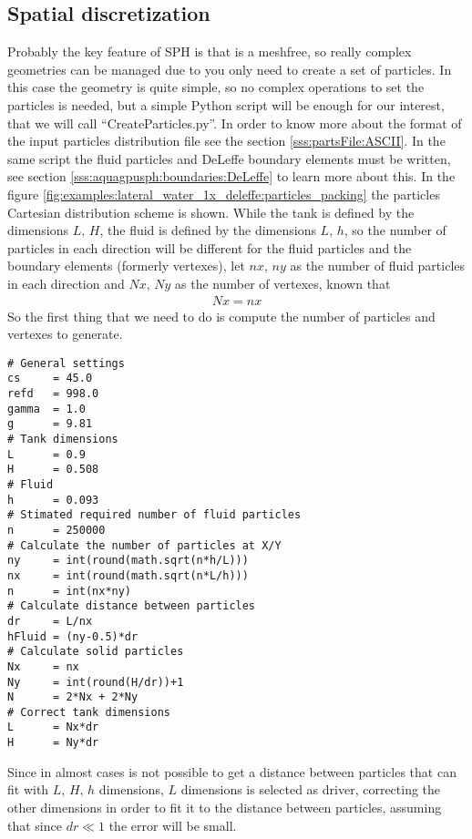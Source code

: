 \subsection{Spatial discretization}
\label{ss:example:lateral_water_1x_deleffe:discretization}
%
Probably the key feature of SPH is that is a meshfree, so really complex geometries can be managed due to you
only need to create a set of particles.\rc
%
In this case the geometry is quite simple, so no complex operations to set the particles is needed, but a simple
Python script will be enough for our interest, that we will call ``CreateParticles.py''.\rc
%
In order to know more about the format of the input particles distribution file see the section
\ref{sss:partsFile:ASCII}.
%
In the same script the fluid particles and DeLeffe boundary elements must be written, see section
\ref{sss:aquagpusph:boundaries:DeLeffe} to learn more about this. In the figure
\ref{fig:examples:lateral_water_1x_deleffe:particles_packing} the particles Cartesian distribution
scheme is shown. While the tank is defined by the dimensions $L, \, H$, the fluid is defined by the dimensions
$L, \, h$, so the number of particles in each direction will be different for the fluid particles and the
boundary elements (formerly vertexes), let $nx, \, ny$ as the number of fluid particles in each direction and
$Nx, \, Ny$ as the number of vertexes, known that
%
\begin{eqnarray}
Nx = nx
\end{eqnarray}
%
So the first thing that we need to do is compute the number of particles and vertexes to generate.
%
\begin{verbatim}
# General settings
cs     = 45.0
refd   = 998.0
gamma  = 1.0
g      = 9.81
# Tank dimensions
L      = 0.9
H      = 0.508
# Fluid
h      = 0.093
# Stimated required number of fluid particles
n      = 250000
# Calculate the number of particles at X/Y
ny     = int(round(math.sqrt(n*h/L)))
nx     = int(round(math.sqrt(n*L/h)))
n      = int(nx*ny)
# Calculate distance between particles
dr     = L/nx
hFluid = (ny-0.5)*dr
# Calculate solid particles
Nx     = nx
Ny     = int(round(H/dr))+1
N      = 2*Nx + 2*Ny
# Correct tank dimensions
L      = Nx*dr
H      = Ny*dr
\end{verbatim}
%
Since in almost cases is not possible to get a distance between particles that can fit with
$L, \, H, \, h$ dimensions, $L$ dimensions is selected as driver, correcting the other dimensions
in order to fit it to the distance between particles, assuming that since $dr \ll 1$ the error
will be small.\rc
